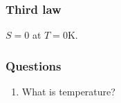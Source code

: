 \documentclass{article}
\begin{document}
\begin{multicols*}{3}
\subsubsection*{Third law}
$S=0$ at $T=0$K.

\subsubsection*{Questions}
\begin{enumerate}
    \item What is temperature?
\end{enumerate}

\end{multicols*}
\end{document}

